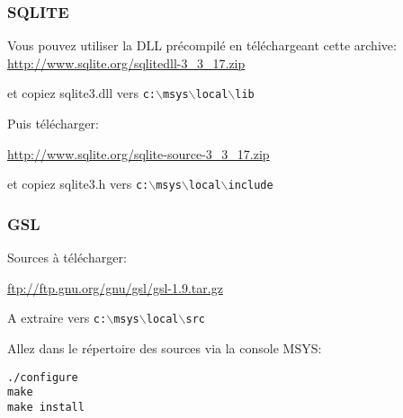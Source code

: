 % 
% 
% 
% 
% 
% 
% 

\subsubsection{SQLITE}
Vous pouvez utiliser la DLL pr\'ecompil\'e en t\'el\'echargeant cette archive:
\url{http://www.sqlite.org/sqlitedll-3\_3\_17.zip}

et copiez sqlite3.dll vers \texttt{c:$\backslash$msys$\backslash$local$\backslash$lib}

Puis t\'el\'echarger:

\url{http://www.sqlite.org/sqlite-source-3\_3\_17.zip}

et copiez sqlite3.h vers \texttt{c:$\backslash$msys$\backslash$local$\backslash$include}

% 
% 
% 
% 
\subsubsection{GSL}
Sources \`a t\'el\'echarger:

\url{ftp://ftp.gnu.org/gnu/gsl/gsl-1.9.tar.gz}

A extraire vers \texttt{c:$\backslash$msys$\backslash$local$\backslash$src}

Allez dans le r\'epertoire des sources via la console MSYS:

\begin{verbatim}
./configure
make
make install
\end{verbatim}

